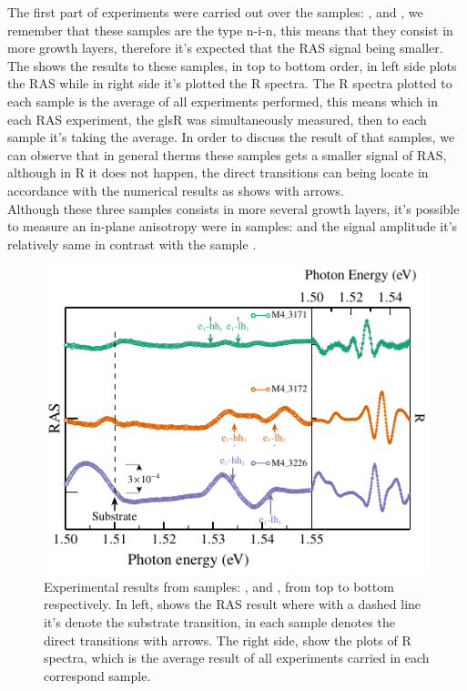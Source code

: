 The first part of experiments were carried out over the samples: ,  and ,  we remember that these samples are the type n-i-n, this means that they consist in more growth layers, therefore it's expected that the \gls{RAS} signal being smaller. The  shows the results to these samples, in top to bottom order, in left side plots the \gls{RAS} while in right side it's plotted the \gls{R} spectra. The \gls{R} spectra plotted to each sample is the average of all experiments performed, this means which in each \gls{RAS} experiment, the gls{R} was simultaneously measured, then to each sample it's taking the average.  In order to discuss the result of that samples, we can observe that in general therms these samples gets a smaller signal of \gls{RAS}, although in \gls{R} it does not happen, the direct transitions can being locate in accordance with the numerical results as shows with arrows.\\
Although these three samples consists in more several growth layers, it's possible to measure an in-plane anisotropy   were in samples:  and  the signal amplitude it's relatively same in contrast with the sample .
\begin{figure}[H]
	\centering
	\includegraphics[width=\textwidth]{../figures/chapter-3/ras-plots/out/ras-set-1.pdf}
	\caption{Experimental results from samples: ,  and , from top to bottom respectively. In left, shows the RAS result where with a dashed line it's denote the substrate transition, in each sample denotes the direct transitions with arrows. The right side, show the plots of R spectra, which is the average result of all experiments carried in each correspond sample.   }
	\label{fig:chapter-3-subsec-ras-plots-set-1}
\end{figure}
